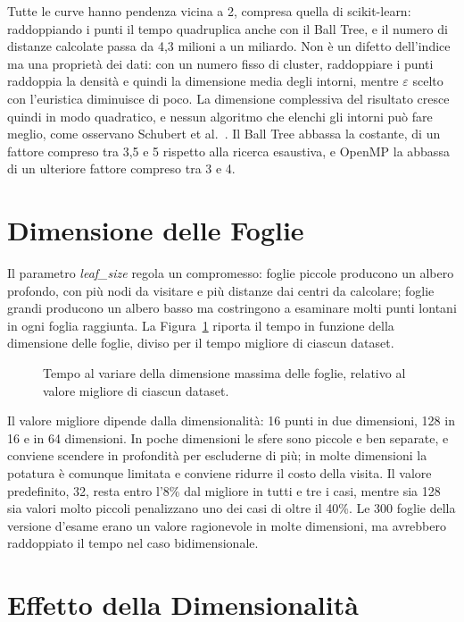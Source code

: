 Tutte le curve hanno pendenza vicina a 2, compresa quella di scikit-learn: raddoppiando i punti il tempo quadruplica anche con il Ball Tree, e il numero di distanze calcolate passa da 4,3 milioni a un miliardo. Non è un difetto dell'indice ma una proprietà dei dati: con un numero fisso di cluster, raddoppiare i punti raddoppia la densità e quindi la dimensione media degli intorni, mentre $\varepsilon$ scelto con l'euristica diminuisce di poco. La dimensione complessiva del risultato cresce quindi in modo quadratico, e nessun algoritmo che elenchi gli intorni può fare meglio, come osservano Schubert et al.~\cite{schubert2017}. Il Ball Tree abbassa la costante, di un fattore compreso tra 3,5 e 5 rispetto alla ricerca esaustiva, e OpenMP la abbassa di un ulteriore fattore compreso tra 3 e 4.

\section{Dimensione delle Foglie}

Il parametro \textit{leaf\_size} regola un compromesso: foglie piccole producono un albero profondo, con più nodi da visitare e più distanze dai centri da calcolare; foglie grandi producono un albero basso ma costringono a esaminare molti punti lontani in ogni foglia raggiunta. La Figura~\ref{fig:foglie} riporta il tempo in funzione della dimensione delle foglie, diviso per il tempo migliore di ciascun dataset.

\begin{figure}[H]
    \centering
    
    \caption{Tempo al variare della dimensione massima delle foglie, relativo al valore migliore di ciascun dataset.}
    \label{fig:foglie}
\end{figure}

Il valore migliore dipende dalla dimensionalità: 16 punti in due dimensioni, 128 in 16 e in 64 dimensioni. In poche dimensioni le sfere sono piccole e ben separate, e conviene scendere in profondità per escluderne di più; in molte dimensioni la potatura è comunque limitata e conviene ridurre il costo della visita. Il valore predefinito, 32, resta entro l'8\% dal migliore in tutti e tre i casi, mentre sia 128 sia valori molto piccoli penalizzano uno dei casi di oltre il 40\%. Le 300 foglie della versione d'esame erano un valore ragionevole in molte dimensioni, ma avrebbero raddoppiato il tempo nel caso bidimensionale.

\section{Effetto della Dimensionalità}
\label{sec:esp-dimensioni}


